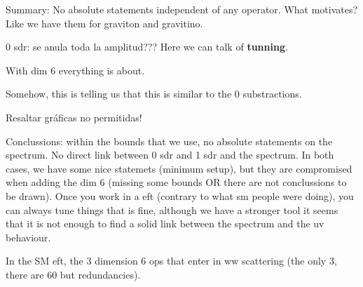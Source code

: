 Summary:
No absolute statements independent of any operator. What motivates? Like we have them for graviton and gravitino.

\begin{Todo}
    0 sdr: se anula toda la amplitud??? Here we can talk of \textbf{tunning}. 
\end{Todo}

With dim 6 everything is about.

Somehow, this is telling us that this is similar to the 0 substractions.

\begin{Todo}
    Resaltar gráficas no permitidas!
\end{Todo}

Conclussions: within the bounds that we use, no absolute statements on the spectrum. No direct link between 0 sdr and 1 sdr and the spectrum. In both cases, we have some nice statemets (minimum setup), but they are compromised when adding the dim 6 (missing some bounds OR there are not conclussions to be drawn). Once you work in a eft (contrary to what sm people were doing), you can always tune things that is fine, although we have a stronger tool it seems that it is not enough to find a solid link between the spectrum and the uv behaviour.

In the SM eft, the 3 dimension 6 ops that enter in ww scattering (the only 3, there are 60 but redundancies).